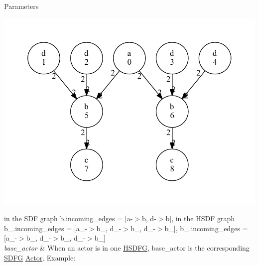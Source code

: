 \begin{DoxyParams}{Parameters}
\begin{DoxyImage}
\includegraphics[width=\textwidth,height=\textheight/2,keepaspectratio=true]{dot_HSDFG_example}
\end{DoxyImage}
 in the S\+DF graph {\ttfamily b.\+incoming\+\_\+edges = \mbox{[}a-\/$>$b, d-\/$>$b\mbox{]}}, in the H\+S\+DF graph {\ttfamily b\+\_.\+incoming\+\_\+edges = \mbox{[}a\+\_-\/$>$b\+\_, d\+\_-\/$>$b\+\_, d\+\_-\/$>$b\+\_\mbox{]}}, {\ttfamily b\+\_.\+incoming\+\_\+edges = \mbox{[}a\+\_-\/$>$b\+\_, d\+\_-\/$>$b\+\_, d\+\_-\/$>$b\+\_\mbox{]}} \\
\hline
{\em base\+\_\+actor} & When an actor is in one \hyperlink{classsylva_1_1base_1_1sdf_1_1_h_s_d_f_g}{H\+S\+D\+FG}, {\ttfamily base\+\_\+actor} is the corresponding \hyperlink{classsylva_1_1base_1_1sdf_1_1_s_d_f_g}{S\+D\+FG} \hyperlink{classsylva_1_1base_1_1sdf_1_1_actor}{Actor}. Example\+: 
\begin{DoxyImage}

\end{DoxyImage}
\end{DoxyParams}
